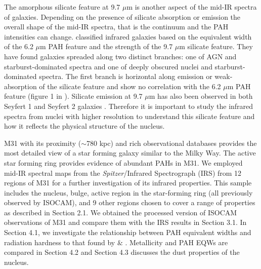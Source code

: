 The amorphous silicate feature at 9.7 $\mu$m is another aspect of the mid-IR spectra of galaxies. Depending on the presence of silicate absorption or emission the overall shape of the mid-IR spectra, that is the continuum and the PAH intensities can change. \citet{Spoon2007} classified infrared galaxies based on the equivalent width of the 6.2 $\mu$m PAH feature and the strength of the 9.7 $\mu$m silicate feature. They have found galaxies spreaded along two distinct branches: one of AGN and starburst-dominated spectra and one of deeply obscured nuclei and starburst-dominated spectra. The first branch is horizontal along emission or weak-absorption of the silicate feature and show no correlation with the 6.2 $\mu$m PAH feature (figure 1 in \citet{Spoon2007}). Silicate emission at 9.7 $\mu$m has also been observed in both Seyfert 1 and Seyfert 2 galaxies \citep{Mason2009}. Therefore it is important to study the infrared spectra from nuclei with higher resolution to understand this silicate feature and how it reflects the physical structure of the nucleus. 

M31 with its proximity ($\sim$780 kpc) and rich observational databases provides the most detailed view of a star forming galaxy similar to the Milky Way. The active star forming ring \citep{Barmby2006lr} provides evidence of abundant PAHs in M31. We employed mid-IR spectral maps from the {\em Spitzer}/Infrared Spectrograph (IRS) from 12 regions of M31 for a further investigation of its infrared properties. This sample includes the nucleus, bulge, active region in the star-forming ring (all previously observed by ISOCAM), and 9 other regions chosen to cover a range of properties as described in Section 2.1. We obtained the processed version of ISOCAM observations of M31 and compare them with the IRS results in Section  3.1. In Section 4.1, we investigate the relationship between PAH equivalent widths and radiation hardness to that found by \citet{Engelbracht_2008} $\&$ \citet{Gordon:2008lr}. Metallicity and PAH EQWs are compared in Section 4.2 and Section 4.3 discusses the dust properties of the nucleus. 	
